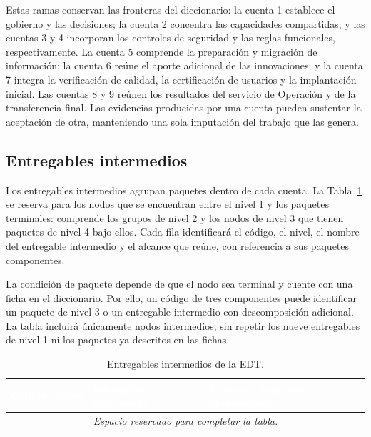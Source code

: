 Estas ramas conservan las fronteras del diccionario: la cuenta 1 establece el gobierno y las decisiones; la cuenta 2 concentra las capacidades compartidas; y las cuentas 3 y 4 incorporan los controles de seguridad y las reglas funcionales, respectivamente. La cuenta 5 comprende la preparación y migración de información; la cuenta 6 reúne el aporte adicional de las innovaciones; y la cuenta 7 integra la verificación de calidad, la certificación de usuarios y la implantación inicial. Las cuentas 8 y 9 reúnen los resultados del servicio de Operación y de la transferencia final. Las evidencias producidas por una cuenta pueden sustentar la aceptación de otra, manteniendo una sola imputación del trabajo que las genera.

\subsection{Entregables intermedios}
\label{subsec:edt-intermedios}

Los entregables intermedios agrupan paquetes dentro de cada cuenta. La Tabla~\ref{tab:edt-intermedios} se reserva para los nodos que se encuentran entre el nivel 1 y los paquetes terminales: comprende los grupos de nivel 2 y los nodos de nivel 3 que tienen paquetes de nivel 4 bajo ellos. Cada fila identificará el código, el nivel, el nombre del entregable intermedio y el alcance que reúne, con referencia a sus paquetes componentes.

La condición de paquete depende de que el nodo sea terminal y cuente con una ficha en el diccionario. Por ello, un código de tres componentes puede identificar un paquete de nivel 3 o un entregable intermedio con descomposición adicional. La tabla incluirá únicamente nodos intermedios, sin repetir los nueve entregables de nivel 1 ni los paquetes ya descritos en las fichas.

\begin{table}[H]
\centering
\caption{Entregables intermedios de la EDT.}
\label{tab:edt-intermedios}
\begingroup
\small
\setlength{\tabcolsep}{4pt}
\renewcommand{\arraystretch}{1.15}
\begin{tabularx}{\linewidth}{@{}p{.12\linewidth}p{.08\linewidth}
  >{\raggedright\arraybackslash}X
  >{\raggedright\arraybackslash}X@{}}
\rowcolor{SynNavy}
\textcolor{white}{\textbf{Código}} &
\textcolor{white}{\textbf{Nivel}} &
\textcolor{white}{\textbf{Entregable intermedio}} &
\textcolor{white}{\textbf{Alcance y paquetes componentes}}\\
\hline


\multicolumn{4}{c}{\rule{0pt}{24mm}\textcolor{SynMuted}{\textit{Espacio reservado para completar la tabla.}}}\\
\hline
\end{tabularx}
\endgroup
\end{table}

